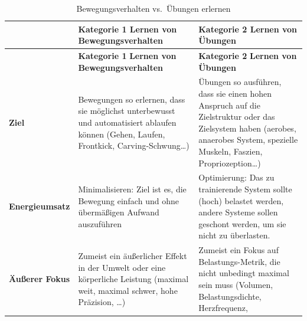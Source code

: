 \documentclass[
  letterpaper,
  DIV=11,
  numbers=noendperiod]{scrreprt}
\begin{document}
\begin{longtable}[]{@{}
  >{\raggedright\arraybackslash}p{}
  >{\raggedright\arraybackslash}p{}
  >{\raggedright\arraybackslash}p{}@{}}
\caption{Bewegungsverhalten vs.~Übungen
erlernen}\label{tbl-MotL1}\tabularnewline
\toprule\noalign{}
\begin{minipage}[b]{\linewidth}\raggedright
\end{minipage} & \begin{minipage}[b]{\linewidth}\raggedright
\textbf{Kategorie 1} \textbf{Lernen von Bewegungsverhalten}
\end{minipage} & \begin{minipage}[b]{\linewidth}\raggedright
\textbf{Kategorie 2} \textbf{Lernen von Übungen}
\end{minipage} \\
\midrule\noalign{}
\endfirsthead
\toprule\noalign{}
\begin{minipage}[b]{\linewidth}\raggedright
\end{minipage} & \begin{minipage}[b]{\linewidth}\raggedright
\textbf{Kategorie 1} \textbf{Lernen von Bewegungsverhalten}
\end{minipage} & \begin{minipage}[b]{\linewidth}\raggedright
\textbf{Kategorie 2} \textbf{Lernen von Übungen}
\end{minipage} \\
\midrule\noalign{}
\endhead
\bottomrule\noalign{}
\endlastfoot
\textbf{Ziel} & Bewegungen so erlernen, dass sie möglichst unterbewusst
und automatisiert ablaufen können (Gehen, Laufen, Frontkick,
Carving-Schwung\ldots) & Übungen so ausführen, dass sie einen hohen
Anspruch auf die Zielstruktur oder das Zielsystem haben (aerobes,
anaerobes System, spezielle Muskeln, Faszien, Propriozeption\ldots) \\
\textbf{Energieumsatz} & Minimalisieren: Ziel ist es, die Bewegung
einfach und ohne übermäßigen Aufwand auszuführen & Optimierung: Das zu
trainierende System sollte (hoch) belastet werden, andere Systeme sollen
geschont werden, um sie nicht zu überlasten. \\
\textbf{Äußerer Fokus} & Zumeist ein äußerlicher Effekt in der Umwelt
oder eine körperliche Leistung (maximal weit, maximal schwer, hohe
Präzision, \ldots) & Zumeist ein Fokus auf Belastungs-Metrik, die nicht
unbedingt maximal sein muss (Volumen, Belastungsdichte, Herzfrequenz,

\end{longtable}
\end{document}
